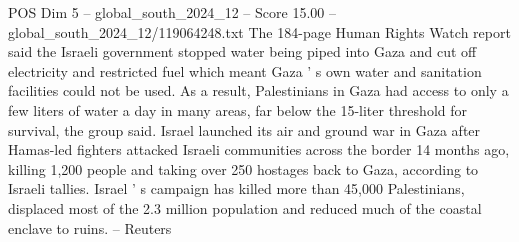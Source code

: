 \begin{textsample}{POS Dim 5 – global\_south\_2024\_12 – Score 15.00 – global\_south\_2024\_12/119064248.txt}
The 184-page Human Rights Watch report said the Israeli government stopped water being piped into Gaza and cut off electricity and restricted fuel which meant Gaza ' s own water and sanitation facilities could not be used.
As a result, Palestinians in Gaza had access to only a few liters of water a day in many areas, far below the 15-liter threshold for survival, the group said.
Israel launched its air and ground war in Gaza after Hamas-led fighters attacked Israeli communities across the border 14 months ago, killing 1,200 people and taking over 250 hostages back to Gaza, according to Israeli tallies.
Israel ' s campaign has killed more than 45,000 Palestinians, displaced most of the 2.3 million population and reduced much of the coastal enclave to ruins. -- Reuters

\end{textsample}
